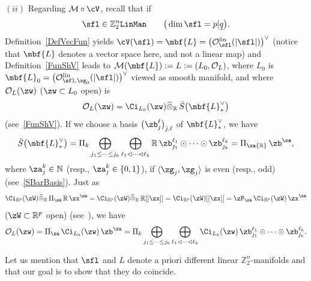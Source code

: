 \documentclass[10pt,a4paper]{amsart}
\newcommand{\op}[1]{\operatorname{#1}}
\newcommand{\R}{{\mathbb R}}
\newcommand{\Z}{{\mathbb Z}}
\def\ul{\underline}
\def\la{\langle}
\def\cM{\cal M}
\def\cO{\mathcal{O}}
\def\cM{\mathcal{M}}
\def\ul{\underline}
\newcommand{\0}{\otimes}
\newcommand{\z}{\Z_2^n}
\numberwithin{equation}{section}
\providecommand{\cal}{\mathcal}
\begin{document}
$(ii)$ Regarding $\cM\circ\cV$, recall that if
\[
\sfl\in\z{\tt LinMan}\qquad \big(\op{dim}\sfl=p|\ul q\big).
\]
Definition~\eqref{DefVecFun} yields $\cV(\sfl)=\mbf{L}=\big(\cO_{\sfl}^{\op{lin}}(|\sfl|)\big)^\vee$ (notice that $\mbf{L}$ denotes a vector space here, and not a linear map) and Definition~\eqref{FunShV} leads to $\cM(\mbf{L}):=L:=(L_0,\cO_L)$, where $L_0$ is $\mbf{L}_0=\big(\cO_{\sfl,\zg_0}^{\op{lin}}(|\sfl|)\big)^\vee$ viewed as smooth manifold, and where $\cO_L(\zw)$ ($\zw\subset L_0$ open) is
\[
\cO_L(\zw)=\Ci_{L_0}(\zw)\widehat{\0}_\R\,\bar S\big(\mbf{L}_*^\vee\big)
\]
(see~\eqref{FunShV}). If we choose a basis $\big(\zb_j^\ell\big)_{j,\ell}$ of $\mbf{L}_*^\vee$, we have
\[
\bar S\big(\mbf{L}^\vee_*\big)=\Pi_k\bigoplus_{j_1\le\cdots\le j_k}\bigoplus_{\ell_1\lhd\cdots\lhd \ell_k}\R\,\zb_{j_1}^{\ell_1}\odot\cdots\odot \zb_{j_k}^{\ell_k}=\Pi_\za\R\,\zb^\za,
\]
where $\za_j^k\in\mathbb{N}$ (resp., $\za_j^k\in\{0,1\}$), if $\la\zg_j,\zg_j\rangle$ is even (resp., odd) (see~\eqref{SBarBasis}). Just as
\[
\Ci_{\R^p}(\zW)\widehat{\0}_\R\,\Pi_\za\,\R\,\zx^\za=\Ci_{\R^p}(\zW)\widehat{\0}_\R\,\R[[\zx]] =\Ci_{\R^p}(\zW)[[\zx]]=\zP_\za\,\Ci_{\R^p}(\zW)\,\zx^\za
\]
($\zW\subset\R^p$ open) (see~\cite{Bruce:2019}), we have
\begin{gather}\label{FctShVec}
\cO_L(\zw)=\Pi_\za\,\Ci_{L_0}(\zw)\,\zb^\za =\Pi_k\bigoplus_{j_1\le\cdots\le j_k}\bigoplus_{\ell_1\lhd\cdots\lhd \ell_k}\Ci_{L_0}(\zw)\,\zb_{j_1}^{\ell_1}\odot\cdots\odot \zb_{j_k}^{\ell_k} .
\end{gather}

\begin{Remark}
Let us mention that $\sfl$ and $L$ denote a priori different linear $\z$-manifolds and that our goal is to show that they do coincide.
\end{Remark}
\end{document}
